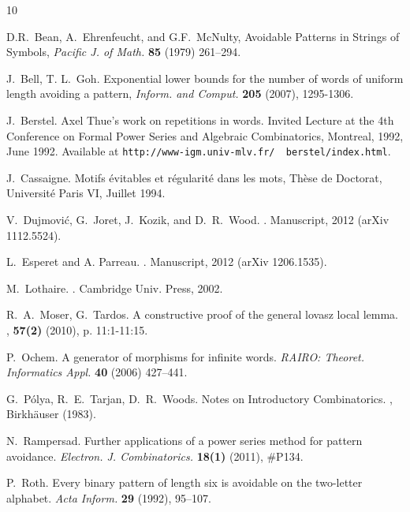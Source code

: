 \documentclass[]{elsart}
\begin{document}
\begin{thebibliography}{10}

 D.R.~Bean, A.~Ehrenfeucht, and G.F.~McNulty,
Avoidable Patterns in Strings of Symbols,
{\em Pacific J. of Math.} {\bf 85} (1979) 261--294.

 J.~Bell, T. L.~Goh.
Exponential lower bounds for the number of words of uniform length avoiding a pattern,
\emph{Inform. and Comput.} {\bf 205}
(2007), 1295-1306.

 J.~Berstel.
\newblock Axel {T}hue's work on repetitions in words.
\newblock Invited Lecture at the 4th Conference on Formal Power Series and
 Algebraic Combinatorics, Montreal, 1992, June 1992.
\newblock Available at {\tt http://www-igm.univ-mlv.fr/{\string
 ~}berstel/index.html}.

 J.~Cassaigne.
Motifs \'evitables et r\'egularit\'e dans les mots,
Th\`ese de Doctorat, Universit\'e Paris VI, Juillet 1994.

 V.~Dujmovi\'c, G.~Joret, J.~Kozik, and D.~R.~Wood.
.
\newblock Manuscript, 2012 (arXiv 1112.5524).

 L.~Esperet and A. Parreau.
.
\newblock Manuscript, 2012 (arXiv 1206.1535).

 M.~Lothaire.
.
\newblock Cambridge Univ. Press, 2002.

R.~A.~Moser, G.~Tardos. 
\newblock A constructive proof of the general lovasz local lemma.
, {\bf 57(2)} (2010), p. 11:1-11:15.

 P.~Ochem.
\newblock A generator of morphisms for infinite words.
\newblock \emph{RAIRO: Theoret. Informatics Appl.} {\bf 40} (2006) 427--441.

G.~P\'olya, R.~E.~Tarjan, D.~R.~Woods.
\newblock Notes on Introductory Combinatorics.
, Birkhäuser (1983).

 N.~Rampersad.
\newblock Further applications of a power series method for pattern avoidance.
\newblock \emph{Electron. J. Combinatorics.} {\bf 18(1)} (2011), \#P134.

 P.~Roth.
\newblock Every binary pattern of length six is avoidable on the
two-letter alphabet.
\newblock \emph{Acta Inform.} {\bf 29} (1992), 95--107.


\end{thebibliography}
\end{document}
